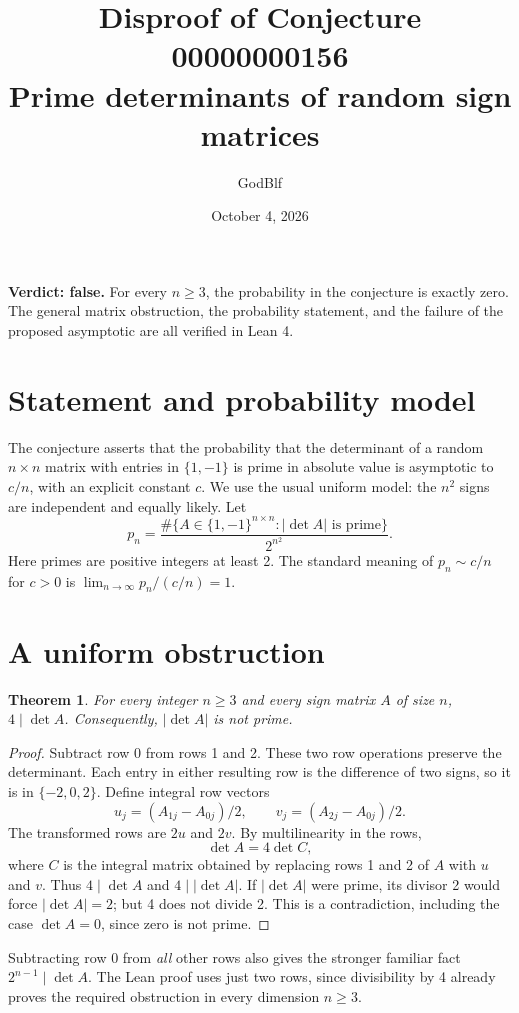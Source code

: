 \documentclass[11pt]{article}
\title{Disproof of Conjecture 00000000156\\Prime determinants of random sign matrices}
\author{GodBlf}
\date{October 4, 2026}
\newtheorem{theorem}{Theorem}
\begin{document}
\maketitle
\noindent\textbf{Verdict: false.} For every $n\ge3$, the probability in the
conjecture is exactly zero. The general matrix obstruction, the probability
statement, and the failure of the proposed asymptotic are all verified in Lean 4.

\section{Statement and probability model}
The conjecture asserts that the probability that the determinant of a random
$n\times n$ matrix with entries in $\{1,-1\}$ is prime in absolute value is
asymptotic to $c/n$, with an explicit constant $c$. We use the usual uniform
model: the $n^2$ signs are independent and equally likely. Let
\[
 p_n=\frac{\#\{A\in\{1,-1\}^{n\times n}: |\det A|\text{ is prime}\}}
 {2^{n^2}}.
\]
Here primes are positive integers at least 2. The standard meaning of
$p_n\sim c/n$ for $c>0$ is $\lim_{n\to\infty}p_n/(c/n)=1$.

\section{A uniform obstruction}
\begin{theorem}
For every integer $n\ge3$ and every sign matrix $A$ of size $n$,
$4\mid\det A$. Consequently, $|\det A|$ is not prime.
\end{theorem}
\begin{proof}
Subtract row 0 from rows 1 and 2. These two row operations preserve the
determinant. Each entry in either resulting row is the difference of two signs,
so it is in $\{-2,0,2\}$. Define integral row vectors
\[
 u_j=(A_{1j}-A_{0j})/2,\qquad v_j=(A_{2j}-A_{0j})/2.
\]
The transformed rows are $2u$ and $2v$. By multilinearity in the rows,
\[
 \det A=4\det C,
\]
where $C$ is the integral matrix obtained by replacing rows 1 and 2 of $A$
with $u$ and $v$. Thus $4\mid\det A$ and $4\mid|\det A|$.
If $|\det A|$ were prime, its divisor 2 would force $|\det A|=2$;
but 4 does not divide 2. This is a contradiction, including the case
$\det A=0$, since zero is not prime.
\end{proof}
Subtracting row 0 from \emph{all} other rows also gives the stronger familiar
fact $2^{n-1}\mid\det A$. The Lean proof uses just two rows, since divisibility
by 4 already proves the required obstruction in every dimension $n\ge3$.
\end{document}
